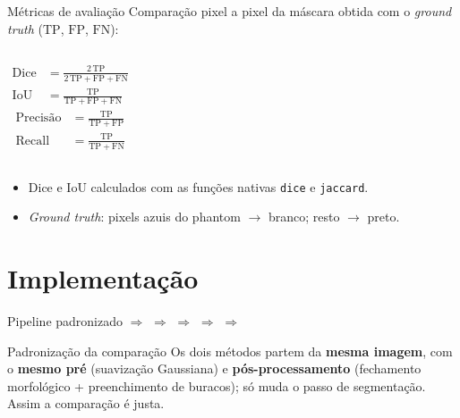 \documentclass[aspectratio=169,11pt]{beamer}
\begin{document}
\begin{frame}{Métricas de avaliação}
  Comparação pixel a pixel da máscara obtida com o \emph{ground truth}
  ($\mathrm{TP}$, $\mathrm{FP}$, $\mathrm{FN}$):
  \begin{columns}[t]
      \begin{align*}
        \mathrm{Dice} &= \frac{2\,\mathrm{TP}}{2\,\mathrm{TP}+\mathrm{FP}+\mathrm{FN}} \\[4pt]
        \mathrm{IoU}  &= \frac{\mathrm{TP}}{\mathrm{TP}+\mathrm{FP}+\mathrm{FN}}
      \end{align*}
      \begin{align*}
        \text{Precisão} &= \frac{\mathrm{TP}}{\mathrm{TP}+\mathrm{FP}} \\[4pt]
        \text{Recall} &= \frac{\mathrm{TP}}{\mathrm{TP}+\mathrm{FN}}
      \end{align*}
  \end{columns}
  \vspace{0.4em}
  \begin{itemize}
    \item Dice e IoU calculados com as funções nativas \texttt{dice} e \texttt{jaccard}.
    \item \emph{Ground truth}: pixels azuis do phantom $\rightarrow$ branco; resto $\rightarrow$ preto.
  \end{itemize}
\end{frame}

\section{Implementação}

\begin{frame}{Pipeline padronizado}
  \centering
  \footnotesize
  \;$\Rightarrow$\;
  \;$\Rightarrow$\;
  \;$\Rightarrow$\;
  \;$\Rightarrow$\;
  \;$\Rightarrow$\;

  \vspace{1.2em}
  \normalsize
  \begin{block}{Padronização da comparação}
    Os dois métodos partem da \textbf{mesma imagem}, com o \textbf{mesmo pré}
    (suavização Gaussiana) e \textbf{pós-processamento} (fechamento morfológico
    + preenchimento de buracos); só muda o passo de segmentação. Assim a
    comparação é justa.
  \end{block}
\end{frame}
\end{document}
